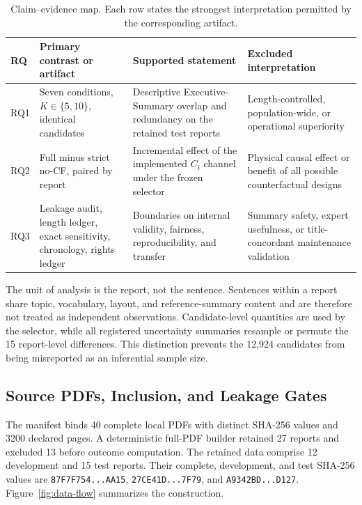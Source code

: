 \documentclass[applsci,article,submit,moreauthors]{Definitions/mdpi}
\begin{document}
\begin{table}[H]
\caption{Claim--evidence map. Each row states the strongest interpretation permitted by the corresponding artifact.}
\label{tab:claim-evidence-map}\centering\small
\begin{tabularx}{\textwidth}{p{1.1cm}p{3.2cm}p{4.1cm}X}
\toprule
RQ & Primary contrast or artifact & Supported statement & Excluded interpretation\\
\midrule
RQ1 & Seven conditions, $K\in\{5,10\}$, identical candidates & Descriptive Executive-Summary overlap and redundancy on the retained test reports & Length-controlled, population-wide, or operational superiority\\
RQ2 & Full minus strict no-CF, paired by report & Incremental effect of the implemented $C_i$ channel under the frozen selector & Physical causal effect or benefit of all possible counterfactual designs\\
RQ3 & Leakage audit, length ledger, exact sensitivity, chronology, rights ledger & Boundaries on internal validity, fairness, reproducibility, and transfer & Summary safety, expert usefulness, or title-concordant maintenance validation\\
\bottomrule
\end{tabularx}
\end{table}

The unit of analysis is the report, not the sentence. Sentences within a report share topic, vocabulary, layout, and reference-summary content and are therefore not treated as independent observations. Candidate-level quantities are used by the selector, while all registered uncertainty summaries resample or permute the 15 report-level differences. This distinction prevents the 12,924 candidates from being misreported as an inferential sample size.

\subsection{Source PDFs, Inclusion, and Leakage Gates}

The manifest binds 40 complete local PDFs with distinct SHA-256 values and 3200 declared pages. A deterministic full-PDF builder retained 27 reports and excluded 13 before outcome computation. The retained data comprise 12 development and 15 test reports. Their complete, development, and test SHA-256 values are \texttt{87F7F754...AA15}, \texttt{27CE41D...7F79}, and \texttt{A9342BD...D127}. Figure~\ref{fig:data-flow} summarizes the construction.
\end{document}
